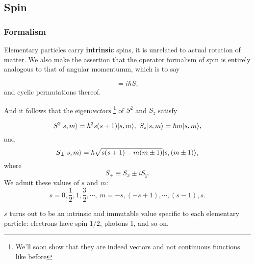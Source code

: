 \subsection{Spin}
\subsubsection{Formalism}
Elementary particles carry \textbf{intrinsic} spins, \ie it is 
unrelated to actual rotation of matter. We also make the assertion that 
the operator formalism of spin is entirely analogous to that of angular 
momentumm, which is to say
\begin{defi}
\begin{equation}
[S_x,S_y]=i\hbar S_z
\end{equation}
and cyclic permutations thereof. 
\end{defi}
And it follows that the eigen\textit{vectors}
\footnote{We'll soon show that they are indeed vectors and not continuous 
functions like before} of $S^2$ and $S_z$ satisfy
\begin{prt}
\begin{equation}
\label{s2eigval}
S^2|s,m\rangle=\hbar^2 s(s+1)|s,m\rangle,\ S_z|s,m\rangle=\hbar m|s,m\rangle, 
\end{equation}
and 
\begin{equation}
S_{\pm}|s,m\rangle=\hbar\sqrt{s(s+1)-m(m\pm1)}|s,(m\pm1)\rangle, 
\end{equation}
where 
\begin{equation}
S_{\pm}\equiv S_x\pm iS_y.
\end{equation}
We admit these values of $s$ and $m$:
\begin{equation}
s=0,\frac{1}{2},1,\frac{3}{2},\cdots,\ m=-s,(-s+1),\cdots,(s-1),s. 
\end{equation}
\end{prt}
$s$ turns out to be an intrinsic and immutable value specific to each elementary
particle: electrons have spin $1/2$, photons $1$, and so on. 
